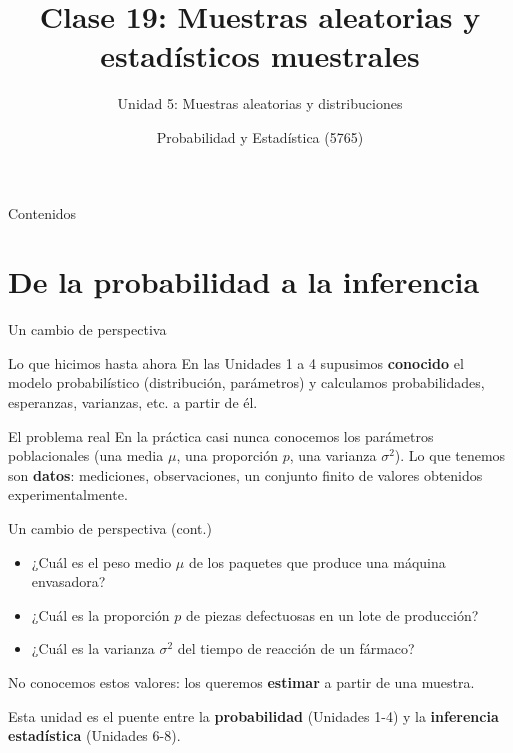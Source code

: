 \documentclass[aspectratio=169,11pt]{beamer}
\title[Prob. y Estadística]{Clase 19: Muestras aleatorias y estadísticos muestrales}
\subtitle{Unidad 5: Muestras aleatorias y distribuciones}
\institute[UNS]{Universidad Nacional del Sur \\ Departamento de Matemática}
\author{Probabilidad y Estadística (5765)}
\date{}
\begin{document}
\begin{frame}
\titlepage
\end{frame}

\begin{frame}{Contenidos}
\tableofcontents
\end{frame}

\section{De la probabilidad a la inferencia}

\begin{frame}{Un cambio de perspectiva}
\begin{block}{Lo que hicimos hasta ahora}
En las Unidades 1 a 4 supusimos \textbf{conocido} el modelo probabilístico (distribución, parámetros) y calculamos probabilidades, esperanzas, varianzas, etc. a partir de él.
\end{block}

\begin{alertblock}{El problema real}
En la práctica casi nunca conocemos los parámetros poblacionales (una media $\mu$, una proporción $p$, una varianza $\sigma^2$). Lo que tenemos son \textbf{datos}: mediciones, observaciones, un conjunto finito de valores obtenidos experimentalmente.
\end{alertblock}

\end{frame}

\begin{frame}{Un cambio de perspectiva (cont.)}
\begin{example}
\begin{itemize}
\item ¿Cuál es el peso medio $\mu$ de los paquetes que produce una máquina envasadora?
\item ¿Cuál es la proporción $p$ de piezas defectuosas en un lote de producción?
\item ¿Cuál es la varianza $\sigma^2$ del tiempo de reacción de un fármaco?
\end{itemize}
No conocemos estos valores: los queremos \textbf{estimar} a partir de una muestra.
\end{example}

Esta unidad es el puente entre la \textbf{probabilidad} (Unidades 1-4) y la \textbf{inferencia estadística} (Unidades 6-8).
\end{frame}
\end{document}
